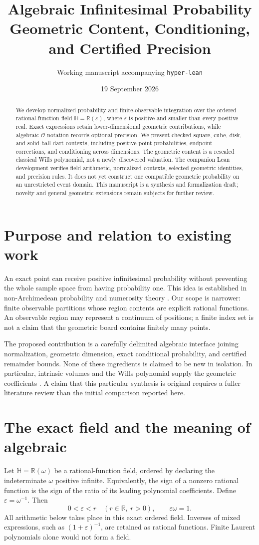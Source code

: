 \documentclass[11pt]{article}
\title{Algebraic Infinitesimal Probability\\
\large Geometric Content, Conditioning, and Certified Precision}
\author{Working manuscript accompanying \texttt{hyper-lean}}
\date{19 September 2026}
\theoremstyle{definition}
\theoremstyle{remark}
\newcommand{\R}{\mathbb R}
\newcommand{\eps}{\varepsilon}
\newcommand{\HH}{\mathbb H}
\newcommand{\OO}{\mathcal O}
\begin{document}
\maketitle
\begin{abstract}
We develop normalized probability and finite-observable integration over the
ordered rational-function field $\HH=\R(\eps)$, where $\eps$ is positive and
smaller than every positive real. Exact expressions retain lower-dimensional
geometric contributions, while algebraic $\OO$-notation records optional
precision. We present checked square, cube, disk, and solid-ball dart
contexts, including positive point probabilities, endpoint corrections,
and conditioning across dimensions. The geometric content is a rescaled
classical Wills polynomial, not a newly discovered valuation. The companion
Lean development verifies field arithmetic, normalized contexts, selected
geometric identities, and precision rules. It does not yet construct one
compatible geometric probability on an unrestricted event domain. This
manuscript is a synthesis and formalization draft; novelty and general
geometric extensions remain subjects for further review.
\end{abstract}

\section{Purpose and relation to existing work}
An exact point can receive positive infinitesimal probability without
preventing the whole sample space from having probability one. This idea
is established in non-Archimedean probability and numerosity theory
\cite{nap,numerosity}. Our scope is narrower: finite observable partitions
whose region contents are explicit rational functions. An observable region
may represent a continuum of positions; a finite index set is not a claim
that the geometric board contains finitely many points.

The proposed contribution is a carefully delimited algebraic interface
joining normalization, geometric dimension, exact conditional probability,
and certified remainder bounds. None of these ingredients is claimed to
be new in isolation. In particular, intrinsic volumes and the Wills
polynomial supply the geometric coefficients \cite{wills,steiner}.
A claim that this particular synthesis is original requires a fuller
literature review than the initial comparison reported here.

\section{The exact field and the meaning of algebraic}
Let $\HH=\R(\omega)$ be a rational-function field, ordered by declaring
the indeterminate $\omega$ positive infinite. Equivalently, the sign of
a nonzero rational function is the sign of the ratio of its leading
polynomial coefficients. Define $\eps=\omega^{-1}$. Then
\[
  0<\eps<r\quad(r\in\R,\ r>0),\qquad \eps\omega=1.
\]
All arithmetic below takes place in this exact ordered field. Inverses
of mixed expressions, such as $(1+\eps)^{-1}$, are retained as rational
functions. Finite Laurent polynomials alone would not form a field.
\end{document}
